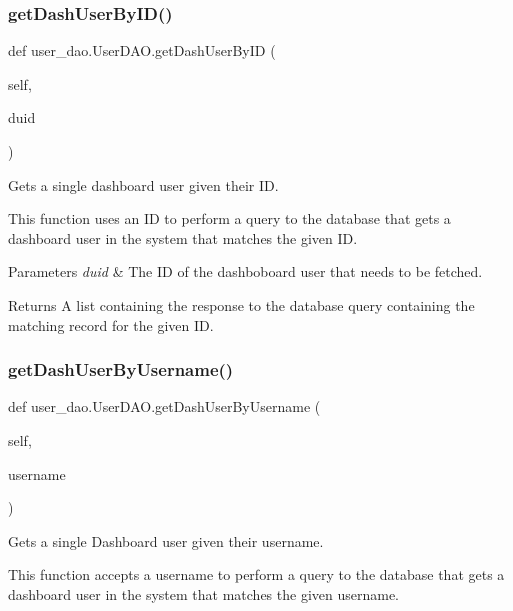 \subsubsection{\texorpdfstring{get\+Dash\+User\+By\+I\+D()}{getDashUserByID()}}
{\footnotesize\ttfamily def user\+\_\+dao.\+User\+D\+A\+O.\+get\+Dash\+User\+By\+ID (\begin{DoxyParamCaption}\item[{}]{self,  }\item[{}]{duid }\end{DoxyParamCaption})}



Gets a single dashboard user given their ID. 

This function uses an ID to perform a query to the database that gets a dashboard user in the system that matches the given ID.


\begin{DoxyParams}{Parameters}
{\em duid} & The ID of the dashboboard user that needs to be fetched.\\
\hline
\end{DoxyParams}
\begin{DoxyReturn}{Returns}
A list containing the response to the database query containing the matching record for the given ID. 
\end{DoxyReturn}
\mbox{\label{classuser__dao_1_1_user_d_a_o_a3abc98ad63b7c8ff6fdc5e9c09e76349}} 
\subsubsection{\texorpdfstring{get\+Dash\+User\+By\+Username()}{getDashUserByUsername()}}
{\footnotesize\ttfamily def user\+\_\+dao.\+User\+D\+A\+O.\+get\+Dash\+User\+By\+Username (\begin{DoxyParamCaption}\item[{}]{self,  }\item[{}]{username }\end{DoxyParamCaption})}



Gets a single Dashboard user given their username. 

This function accepts a username to perform a query to the database that gets a dashboard user in the system that matches the given username.


